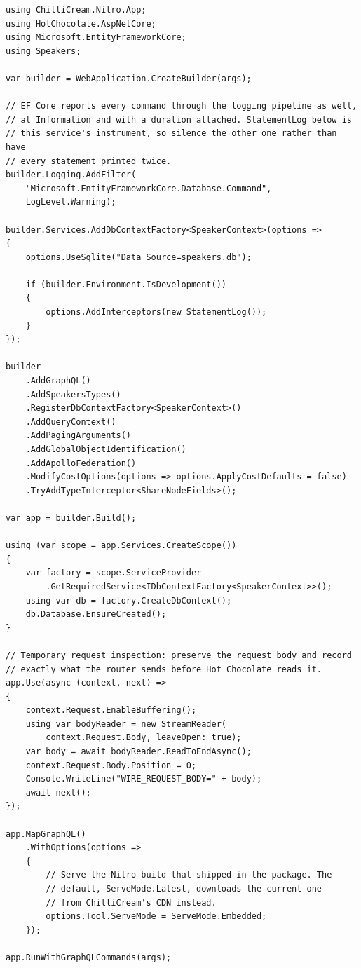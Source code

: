 \begin{verbatim}
using ChilliCream.Nitro.App;
using HotChocolate.AspNetCore;
using Microsoft.EntityFrameworkCore;
using Speakers;

var builder = WebApplication.CreateBuilder(args);

// EF Core reports every command through the logging pipeline as well,
// at Information and with a duration attached. StatementLog below is
// this service's instrument, so silence the other one rather than have
// every statement printed twice.
builder.Logging.AddFilter(
    "Microsoft.EntityFrameworkCore.Database.Command",
    LogLevel.Warning);

builder.Services.AddDbContextFactory<SpeakerContext>(options =>
{
    options.UseSqlite("Data Source=speakers.db");

    if (builder.Environment.IsDevelopment())
    {
        options.AddInterceptors(new StatementLog());
    }
});

builder
    .AddGraphQL()
    .AddSpeakersTypes()
    .RegisterDbContextFactory<SpeakerContext>()
    .AddQueryContext()
    .AddPagingArguments()
    .AddGlobalObjectIdentification()
    .AddApolloFederation()
    .ModifyCostOptions(options => options.ApplyCostDefaults = false)
    .TryAddTypeInterceptor<ShareNodeFields>();

var app = builder.Build();

using (var scope = app.Services.CreateScope())
{
    var factory = scope.ServiceProvider
        .GetRequiredService<IDbContextFactory<SpeakerContext>>();
    using var db = factory.CreateDbContext();
    db.Database.EnsureCreated();
}

// Temporary request inspection: preserve the request body and record
// exactly what the router sends before Hot Chocolate reads it.
app.Use(async (context, next) =>
{
    context.Request.EnableBuffering();
    using var bodyReader = new StreamReader(
        context.Request.Body, leaveOpen: true);
    var body = await bodyReader.ReadToEndAsync();
    context.Request.Body.Position = 0;
    Console.WriteLine("WIRE_REQUEST_BODY=" + body);
    await next();
});

app.MapGraphQL()
    .WithOptions(options =>
    {
        // Serve the Nitro build that shipped in the package. The
        // default, ServeMode.Latest, downloads the current one
        // from ChilliCream's CDN instead.
        options.Tool.ServeMode = ServeMode.Embedded;
    });

app.RunWithGraphQLCommands(args);
\end{verbatim}

